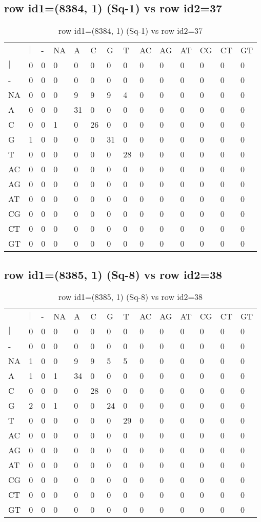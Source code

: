 \subsection{row id1=(8384, 1) (Sq-1) vs row id2=37}
\begin{center}
\begin{longtable}{|l|l|l|l|l|l|l|l|l|l|l|l|l|l|}
\caption{row id1=(8384, 1) (Sq-1) vs row id2=37} \label{table_dm630}\\
\hline
\\
\hline
&$|$&-&NA&A&C&G&T&AC&AG&AT&CG&CT&GT\\
$|$&0&0&0&0&0&0&0&0&0&0&0&0&0\\
-&0&0&0&0&0&0&0&0&0&0&0&0&0\\
NA&0&0&0&9&9&9&4&0&0&0&0&0&0\\
A&0&0&0&31&0&0&0&0&0&0&0&0&0\\
C&0&0&1&0&26&0&0&0&0&0&0&0&0\\
G&1&0&0&0&0&31&0&0&0&0&0&0&0\\
T&0&0&0&0&0&0&28&0&0&0&0&0&0\\
AC&0&0&0&0&0&0&0&0&0&0&0&0&0\\
AG&0&0&0&0&0&0&0&0&0&0&0&0&0\\
AT&0&0&0&0&0&0&0&0&0&0&0&0&0\\
CG&0&0&0&0&0&0&0&0&0&0&0&0&0\\
CT&0&0&0&0&0&0&0&0&0&0&0&0&0\\
GT&0&0&0&0&0&0&0&0&0&0&0&0&0\\
\hline
\end{longtable}
\end{center}

\subsection{row id1=(8385, 1) (Sq-8) vs row id2=38}
\begin{center}
\begin{longtable}{|l|l|l|l|l|l|l|l|l|l|l|l|l|l|}
\caption{row id1=(8385, 1) (Sq-8) vs row id2=38} \label{table_dm632}\\
\hline
\\
\hline
&$|$&-&NA&A&C&G&T&AC&AG&AT&CG&CT&GT\\
$|$&0&0&0&0&0&0&0&0&0&0&0&0&0\\
-&0&0&0&0&0&0&0&0&0&0&0&0&0\\
NA&1&0&0&9&9&5&5&0&0&0&0&0&0\\
A&1&0&1&34&0&0&0&0&0&0&0&0&0\\
C&0&0&0&0&28&0&0&0&0&0&0&0&0\\
G&2&0&1&0&0&24&0&0&0&0&0&0&0\\
T&0&0&0&0&0&0&29&0&0&0&0&0&0\\
AC&0&0&0&0&0&0&0&0&0&0&0&0&0\\
AG&0&0&0&0&0&0&0&0&0&0&0&0&0\\
AT&0&0&0&0&0&0&0&0&0&0&0&0&0\\
CG&0&0&0&0&0&0&0&0&0&0&0&0&0\\
CT&0&0&0&0&0&0&0&0&0&0&0&0&0\\
GT&0&0&0&0&0&0&0&0&0&0&0&0&0\\
\hline
\end{longtable}
\end{center}

